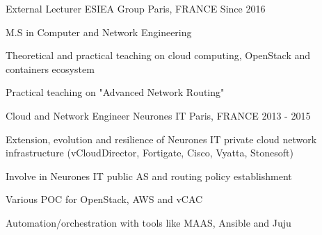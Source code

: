 \begin{cventries}
  \cventry
    {External Lecturer} %
    {ESIEA Group}
    {Paris, FRANCE} %
    {Since 2016} %
    {
      \begin{cvitems} %
      \item{M.S in Computer and Network Engineering} %
        \item {Theoretical and practical teaching on cloud computing, OpenStack
          and containers ecosystem}
        \item {Practical teaching on "Advanced Network Routing"}
      \end{cvitems}
    }

  \cventry
    {Cloud and Network Engineer}
    {Neurones IT} %
    {Paris, FRANCE} %
    {2013 - 2015} %
    {
      \begin{cvitems} %
        \item {Extension, evolution and resilience of Neurones IT private cloud
          network infrastructure (vCloudDirector, Fortigate, Cisco, Vyatta,
          Stonesoft)}
        \item {Involve in Neurones IT public AS and routing policy
          establishment}
        \item {Various POC for OpenStack, AWS and vCAC}
        \item {Automation/orchestration with tools like MAAS, Ansible and Juju}
      \end{cvitems}
    }

\end{cventries}
